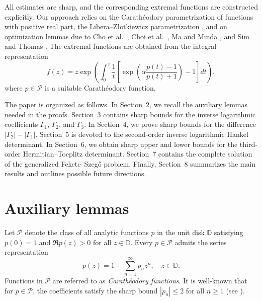 \documentclass[10pt,a4paper]{amsart}
\numberwithin{equation}{section}
\begin{document}
All estimates are sharp, and the corresponding extremal functions are constructed explicitly. Our approach relies on the Carath\'eodory parametrization of functions with positive real part, the Libera--Z{\l}otkiewicz parametrization \cite{LZ}, and on optimization lemmas due to Cho et al.\ \cite{C12}, Choi et al.\ \cite{CKS1}, Ma and Minda \cite{MM}, and Sim and Thomas \cite{SimThomas2020}. The extremal functions are obtained from the integral representation
\[
f(z)
=
z\exp\left(
\int_0^z \frac{1}{t}
\left[
\exp\left(
\alpha\frac{p(t)-1}{p(t)+1}
\right)
-1
\right]
dt
\right),
\]
where $p\in\mathcal{P}$ is a suitable Carath\'eodory function.

The paper is organized as follows. In Section~2, we recall the auxiliary lemmas needed in the proofs. Section~3 contains sharp bounds for the inverse logarithmic coefficients $\Gamma_1$, $\Gamma_2$, and $\Gamma_3$. In Section~4, we prove sharp bounds for the difference $|\Gamma_2|-|\Gamma_1|$. Section~5 is devoted to the second-order inverse logarithmic Hankel determinant. In Section~6, we obtain sharp upper and lower bounds for the third-order Hermitian--Toeplitz determinant. Section~7 contains the complete solution of the generalized Fekete--Szeg\H{o} problem. Finally, Section~8 summarizes the main results and outlines possible future directions.
\section{Auxiliary lemmas}

Let $\mathcal{P}$ denote the class of all analytic functions $p$ in the unit disk $\mathbb{D}$ satisfying $p(0) = 1$ and $\Re p(z) > 0$ for all $z \in \mathbb{D}$. Every $p \in \mathcal{P}$ admits the series representation
\begin{equation}\label{p1}
p(z) = 1 + \sum_{n=1}^{\infty} p_n z^n, \quad z \in \mathbb{D}.
\end{equation}
Functions in $\mathcal{P}$ are referred to as \emph{Carath\'{e}odory functions}. It is well-known that for $p \in \mathcal{P}$, the coefficients satisfy the sharp bound $|p_n| \le 2$ for all $n \ge 1$ (see \cite{PLD1}).
\end{document}
